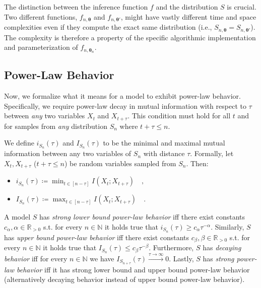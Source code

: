 \documentclass[../../main.tex]{subfiles}
\begin{document}
    \begin{remark}
        The distinction between the inference function $f$ and the distribution $S$ is crucial. Two different functions, $f_{n, \bm{\theta}}$ and $f_{n, \bm{\theta}'}$, might have vastly different time and space complexities even if they compute the exact same distribution (i.e., $S_{n, \bm{\theta}} = S_{n, \bm{\theta}'}$). The complexity is therefore a property of the specific algorithmic implementation and parameterization of $f_{n, \bm{\theta}_n}$.
    \end{remark}


\subsection{Power-Law Behavior}
    Now, we formalize what it means for a model to exhibit power-law behavior. Specifically, we require power-law decay in mutual information with respect to $\tau$ between \emph{any} two variables $X_t$ and $X_{t + \tau}$. This condition must hold for all $t$ and for samples from \emph{any} distribution $S_n$ where $t + \tau \leq n$.

    \begin{definition}
        We define $i_{S_n}(\tau)$ and $I_{S_n}(\tau)$ to be the minimal and maximal mutual information between any two variables of $S_n$ with distance $\tau$. Formally, let $X_t, X_{t + \tau}$ ($t + \tau \leq n$) be random variables sampled from $S_n$. Then:
        \vspace{-1em}
        \begin{itemize}
            \item $i_{S_n}(\tau) \coloneqq \min_{t \in [n - \tau]} I(X_t; X_{t + \tau}) \quad ,$
            \item $I_{S_n}(\tau) \coloneqq \max_{t \in [n - \tau]} I(X_t; X_{t + \tau}) \quad .$
        \end{itemize}
    \end{definition}

    \begin{definition}
        \label{definition:strong_model_power_law_behavior}
        A model $S$ has \emph{strong lower bound power-law behavior} iff there exist constants $c_\alpha, \alpha \in \mathbb{R}_{>0}$ s.t. for every $n \in \mathbb{N}$ it holds true that $i_{S_n}(\tau) \geq c_\alpha \tau^{-\alpha}$. Similarly, $S$ has \emph{upper bound power-law behavior} iff there exist constants $c_\beta, \beta \in \mathbb{R}_{>0}$ s.t. for every $n \in \mathbb{N}$ it holds true that $I_{S_n}(\tau) \leq c_\beta \tau^{-\beta}$. Furthermore, $S$ has \emph{decaying behavior} iff for every $n \in \mathbb{N}$ we have $I_{S_{n + \tau}}(\tau) \xrightarrow{\tau \to \infty} 0$. Lastly, $S$ has \emph{strong power-law behavior} iff it has strong lower bound and upper bound power-law behavior (alternatively decaying behavior instead of upper bound power-law behavior).
    \end{definition}
\end{document}
